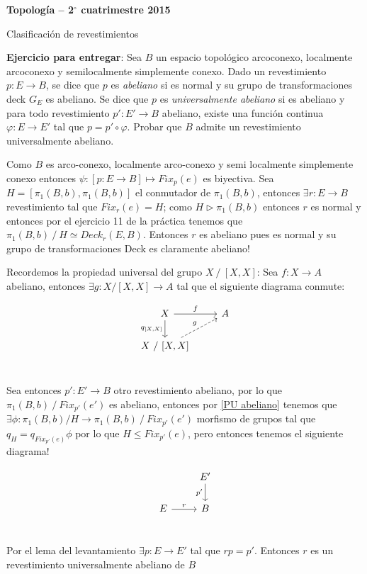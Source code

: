 \documentclass[11pt]{article}
\newenvironment{proof}[1][Demostraci\'on]{\begin{trivlist}
\item[\hskip \labelsep {\bfseries #1}]}{\end{trivlist}}
\newcommand{\qed}{\nobreak \ifvmode \relax \else
      \ifdim\lastskip<1.5em \hskip-\lastskip
      \hskip1.5em plus0em minus0.5em \fi \nobreak
      \vrule height0.75em width0.5em depth0.25em\fi}
\begin{document}
\pagestyle{empty}
\pagestyle{fancy}
\fancyfoot[CO]{\slshape \thepage}
\renewcommand{\headrulewidth}{0pt}



\centerline{\bf Topolog\'ia -- 2$^\circ$
cuatrimestre 2015}
\centerline{\sc Clasificaci\'on de revestimientos}

\bigskip

\textbf{Ejercicio para entregar}: Sea $B$ un espacio topol\'ogico arcoconexo, localmente arcoconexo y semilocalmente simplemente 
conexo.
Dado un revestimiento $p:E\rightarrow B$, se dice que $p$ es \textit{abeliano} si es normal y su grupo de transformaciones deck
$G_E$ es abeliano. Se dice  que $p$ es \textit{universalmente abeliano} si es abeliano y para todo revestimiento
$p':E'\rightarrow B$ abeliano, existe una funci\'on continua $\varphi:E\rightarrow E'$ tal que
$p=p' \circ \varphi$. 
Probar que $B$ admite un revestimiento universalmente abeliano.

\begin{proof}
Como $B$ es arco-conexo, localmente arco-conexo y semi localmente simplemente conexo entonces $\psi : [p : E \rightarrow B] \mapsto Fix_p(e)$ es biyectiva. Sea $H = [\pi_1(B,b),\pi_1(B,b)]$ el conmutador de $\pi_1(B,b)$, entonces $\exists r: E \rightarrow B$ revestimiento tal que $Fix_r(e)=H$; como $H \triangleright \pi_1(B,b)$ entonces $r$ es normal y entonces por el ejercicio 11 de la pr\'actica tenemos que $\pi_1(B,b) \ / \ H \simeq \textit{Deck}_r(E,B)$. Entonces $r$ es abeliano pues es normal y su grupo de transformaciones Deck es claramente abeliano!
 
Recordemos la propiedad universal del grupo $X \ / \ [X,X]$: Sea $f:X \rightarrow A$ abeliano, entonces $\exists g : X / [X,X] \rightarrow A$ tal que el siguiente diagrama conmute:

\begin{equation}
\label{PU abeliano}
\begin{tikzcd}
X \arrow{r}{f} \arrow[swap]{d}{q_{[X,X]}} & A \\
X \ / \ [X,X] \arrow[dashed]{ur}{g} \\
\end{tikzcd}
\end{equation}

Sea entonces $p':E' \rightarrow B$ otro revestimiento abeliano, por lo que $\pi_1(B,b) \ / \ Fix_{p'}(e')$ es abeliano, entonces por \ref{PU abeliano} tenemos que $\exists \phi: \pi_1(B,b)/H \rightarrow \pi_1(B,b) \ / \ Fix_{p'}(e')$ morfismo de grupos tal que $q_{H} = q_{Fix_{p'}(e)} \phi$ por lo que $H \leq Fix_{p'}(e)$, pero entonces tenemos el siguiente diagrama!

\[
\begin{tikzcd}
& E' \arrow[swap]{d}{p'} \\
E \arrow{r}{r} & B\\
\end{tikzcd}
\]

Por el lema del levantamiento $\exists p: E \rightarrow E'$ tal que $rp = p'$. Entonces $r$ es un revestimiento universalmente abeliano de $B$ \qed

\end{proof}
\end{document}
